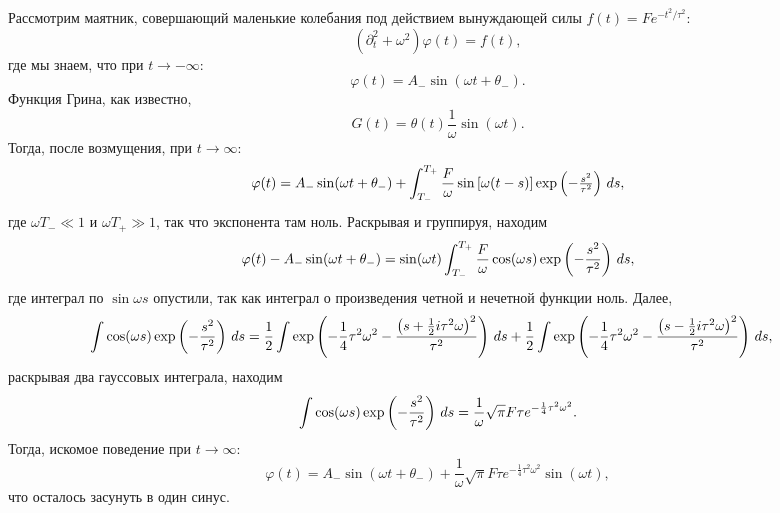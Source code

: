 Рассмотрим маятник, совершающий маленькие колебания под действием вынуждающей силы $f(t) = F e^{-t^2/\tau^2}$:
\begin{equation*}
    \left(\partial_t^2 + \omega^2\right) \varphi(t) = f(t),
\end{equation*}
где мы знаем, что при $t \to - \infty$:
\begin{equation*}
    \varphi(t) = A_- \sin(\omega t + \theta_-).
\end{equation*}
Функция Грина, как известно,
\begin{equation*}
    G(t) = \theta(t) \frac{1}{\omega} \sin(\omega t).
\end{equation*}
Тогда, после возмущения, при $t \to \infty$:
\begin{equation*}
    \varphi(t) = A_- \sin(\omega t + \theta_-) + \int_{T_-}^{T_+} 
    \frac{F}{\omega} \sin\left[\omega(t-s)\right] \exp\left(- \tfrac{s^2}{\tau^2}\right) \, d s,
\end{equation*}
где $\omega T_- \ll 1$ и $\omega T_+ \gg 1$, так что экспонента там ноль. Раскрывая и группируя, находим
\begin{equation*}
    \varphi(t) -  A_- \sin(\omega t + \theta_-) =\sin(\omega t) \int_{T_-}^{T_+}  \frac{F}{\omega} \cos(\omega s) \exp\left(-\frac{s^2}{\tau^2}\right) \, d s,
\end{equation*}
где интеграл по $\sin \omega s$ опустили, так как интеграл о произведения четной и нечетной функции ноль.  Далее,
\begin{align*}
    \int \cos(\omega s) \exp\left(- \frac{s^2}{\tau^2}\right) \, d s &= \frac{1}{2} \int \exp\left(-\frac{1}{4} \tau ^2 \omega ^2-\frac{\left(s+\frac{1}{2} i \tau ^2 \omega \right)^2}{\tau ^2}\right) \, d s  + \frac{1}{2}
    \int \exp\left(
        -\frac{1}{4} \tau ^2 \omega ^2-\frac{\left(s-\frac{1}{2} i \tau ^2 \omega \right)^2}{\tau ^2}
    \right) \, d s,
\end{align*}
раскрывая два гауссовых интеграла, находим
\begin{equation*}
    \int \cos(\omega s) \exp\left(- \frac{s^2}{\tau^2}\right) \, d s = \frac{1}{\omega }\sqrt{\pi } F \tau  e^{-\frac{1}{4} \tau ^2 \omega ^2}.
\end{equation*}
Тогда, искомое поведение при $t \to \infty$:
\begin{equation*}
    \varphi(t)  = A_- \sin(\omega t + \theta_-)  + 
    \frac{1}{\omega }\sqrt{\pi } F \tau  e^{-\frac{1}{4} \tau ^2 \omega ^2}
    \sin(\omega t),
\end{equation*}
что осталось засунуть в один синус.

